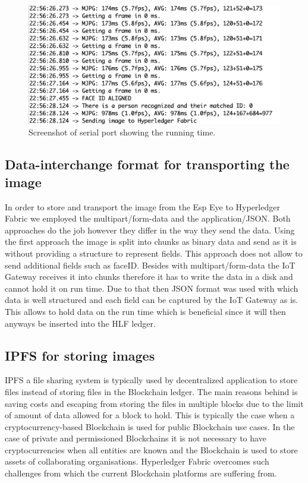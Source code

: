 \begin{figure}[!htb]
    \centering
    \includegraphics[width=1\textwidth]{figures/time_facedetection.png}
    \caption{Screenshot of serial port showing the running time.}
    \label{fig:time_face}
\end{figure}




\subsection{Data-interchange format for transporting the image }

In order to store and transport the image from the Esp Eye to Hyperledger Fabric we employed the multipart/form-data and the application/JSON. Both approaches do the job however they differ in the way they send the data. Using the first approach the image is split into chunks as binary data and send as it is without providing a structure to represent fields. This approach does not allow to send additional fields such as faceID. Besides with multipart/form-data the IoT Gateway receives it into chunks therefore it has to write the data in a disk and cannot hold it on run time. Due to that then JSON format was used with which data is well structured and each field can be captured by the IoT Gateway as is. This allows to hold data on the run time which is beneficial since it will then anyways be inserted into the HLF ledger.  

\subsection{IPFS for storing images}

IPFS a file sharing system is typically used by decentralized application to store files instead of storing files in the Blockchain ledger. The main reasons behind is saving costs and escaping from storing the files in multiple blocks due to the limit of amount of data allowed for a block to hold.  This is typically the case when a cryptocurrency-based Blockchain is used for public Blockchain use cases. In the case of private and permissioned Blockchains it is not necessary to have cryptocurrencies when all entities are known and the Blockchain is used to store assets of collaborating organisations. Hyperledger Fabric overcomes such challenges from which the current Blockchain platforms are suffering from. 

